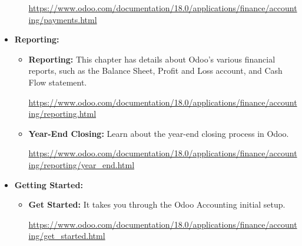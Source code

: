 \documentclass[11pt,a4paper]{article}
\begin{document}
\begin{itemize}
\begin{itemize}
        \url{https://www.odoo.com/documentation/18.0/applications/finance/accounting/payments.html}
    \end{itemize}
    \item \textbf{Reporting:} 
    \begin{itemize}
        \item \textbf{Reporting:} This chapter has details about Odoo's various financial reports, such as the Balance Sheet, Profit and Loss account, and Cash Flow statement.
        
        \url{https://www.odoo.com/documentation/18.0/applications/finance/accounting/reporting.html}

        \item \textbf{Year-End Closing:} Learn about the year-end closing process in Odoo.
        
        \url{https://www.odoo.com/documentation/18.0/applications/finance/accounting/reporting/year\_end.html}
    \end{itemize}

    \item \textbf{Getting Started:}
    \begin{itemize}
        \item \textbf{Get Started:} It takes you through the Odoo Accounting initial setup.
        
        \url{https://www.odoo.com/documentation/18.0/applications/finance/accounting/get\_started.html}
    \end{itemize}
\end{itemize}
\end{document}
